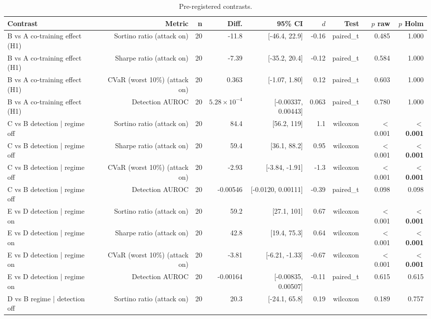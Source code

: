 \begin{table}[htbp]
  \centering
  \caption{Pre-registered contrasts.}
  \label{tab:contrasts}
  \begin{tabular}{lrrrrrrrr}
    \toprule
    Contrast & Metric & n & Diff. & 95\% CI & $d$ & Test & $p$ raw & $p$ Holm \\
    \midrule
    B vs A   co-training effect (H1) & Sortino ratio (attack on) & 20 & -11.8 & [-46.4, 22.9] & -0.16 & paired\_t & 0.485 & 1.000 \\
    B vs A   co-training effect (H1) & Sharpe ratio (attack on) & 20 & -7.39 & [-35.2, 20.4] & -0.12 & paired\_t & 0.584 & 1.000 \\
    B vs A   co-training effect (H1) & CVaR (worst 10\%) (attack on) & 20 & 0.363 & [-1.07, 1.80] & 0.12 & paired\_t & 0.603 & 1.000 \\
    B vs A   co-training effect (H1) & Detection AUROC & 20 & $5.28\times10^{-4}$ & [-0.00337, 0.00443] & 0.063 & paired\_t & 0.780 & 1.000 \\
    C vs B   detection | regime off & Sortino ratio (attack on) & 20 & 84.4 & [56.2, 119] & 1.1 & wilcoxon & $<$0.001 & \textbf{$<$0.001} \\
    C vs B   detection | regime off & Sharpe ratio (attack on) & 20 & 59.4 & [36.1, 88.2] & 0.95 & wilcoxon & $<$0.001 & \textbf{$<$0.001} \\
    C vs B   detection | regime off & CVaR (worst 10\%) (attack on) & 20 & -2.93 & [-3.84, -1.91] & -1.3 & wilcoxon & $<$0.001 & \textbf{$<$0.001} \\
    C vs B   detection | regime off & Detection AUROC & 20 & -0.00546 & [-0.0120, 0.00111] & -0.39 & paired\_t & 0.098 & 0.098 \\
    E vs D   detection | regime on & Sortino ratio (attack on) & 20 & 59.2 & [27.1, 101] & 0.67 & wilcoxon & $<$0.001 & \textbf{$<$0.001} \\
    E vs D   detection | regime on & Sharpe ratio (attack on) & 20 & 42.8 & [19.4, 75.3] & 0.64 & wilcoxon & $<$0.001 & \textbf{$<$0.001} \\
    E vs D   detection | regime on & CVaR (worst 10\%) (attack on) & 20 & -3.81 & [-6.21, -1.33] & -0.67 & wilcoxon & $<$0.001 & \textbf{$<$0.001} \\
    E vs D   detection | regime on & Detection AUROC & 20 & -0.00164 & [-0.00835, 0.00507] & -0.11 & paired\_t & 0.615 & 0.615 \\
    D vs B   regime | detection off & Sortino ratio (attack on) & 20 & 20.3 & [-24.1, 65.8] & 0.19 & wilcoxon & 0.189 & 0.757 \\

\end{tabular}
\end{table}
